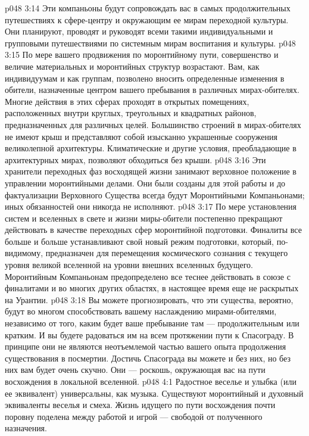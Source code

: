 \vs p048 3:14 \bibnobreakspace {} Эти компаньоны будут сопровождать вас в самых продолжительных путешествиях к сфере\hyp{}центру и окружающим ее мирам переходной культуры. Они планируют, проводят и руководят всеми такими индивидуальными и групповыми путешествиями по системным мирам воспитания и культуры.
\vs p048 3:15 \bibnobreakspace {} По мере вашего продвижения по моронтийному пути, совершенство и величие материальных и моронтийных структур возрастают. Вам, как индивидуумам и как группам, позволено вносить определенные изменения в обители, назначенные центром вашего пребывания в различных мирах\hyp{}обителях. Многие действия в этих сферах проходят в открытых помещениях, расположенных внутри круглых, треугольных и квадратных районов, предназначенных для различных целей. Большинство строений в мирах\hyp{}обителях не имеют крыш и представляют собой изысканно украшенные сооружения великолепной архитектуры. Климатические и другие условия, преобладающие в архитектурных мирах, позволяют обходиться без крыши.
\vs p048 3:16 \pc Эти хранители переходных фаз восходящей жизни занимают верховное положение в управлении моронтийными делами. Они были созданы для этой работы и до фактуализации Верховного Существа всегда будут Моронтийными Компаньонами; иных обязанностей они никогда не исполняют.
\vs p048 3:17 По мере установления систем и вселенных в свете и жизни миры\hyp{}обители постепенно прекращают действовать в качестве переходных сфер моронтийной подготовки. Финалиты все больше и больше устанавливают свой новый режим подготовки, который, по\hyp{}видимому, предназначен для перемещения космического сознания с текущего уровня великой вселенной на уровни внешних вселенных будущего. Моронтийным Компаньонам предопределено все теснее действовать в союзе с финалитами и во многих других областях, в настоящее время еще не раскрытых на Урантии.
\vs p048 3:18 Вы можете прогнозировать, что эти существа, вероятно, будут во многом способствовать вашему наслаждению мирами\hyp{}обителями, независимо от того, каким будет ваше пребывание там --- продолжительным или кратким. И вы будете радоваться им на всем протяжении пути к Спасограду. В принципе они не являются неотъемлемой частью вашего опыта продолжения существования в посмертии. Достичь Спасограда вы можете и без них, но без них вам будет очень скучно. Они --- роскошь, окружающая вас на пути восхождения в локальной вселенной.
\vs p048 4:1 Радостное веселье и улыбка (или ее эквивалент) универсальны, как музыка. Существуют моронтийный и духовный эквиваленты веселья и смеха. Жизнь идущего по пути восхождения почти поровну поделена между работой и игрой --- свободой от полученного назначения.
